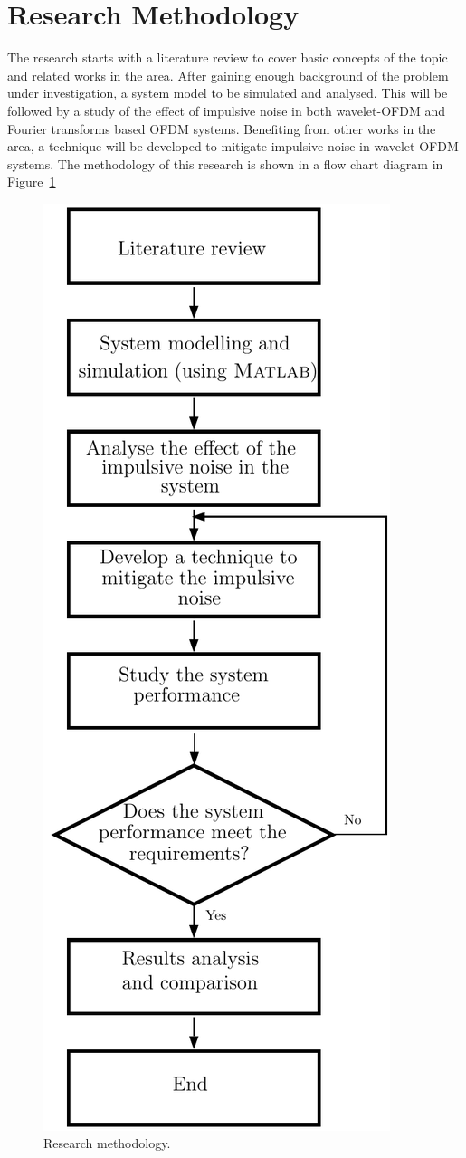 	\section{Research Methodology}
		The research starts with a literature review to cover basic concepts of the topic and related works in the area. After gaining enough background of the problem under investigation, a system model to be simulated and analysed. This will be followed by a study of the effect of impulsive noise in both wavelet-OFDM and Fourier transforms based OFDM systems. Benefiting from other works in the area, a technique will be developed to mitigate impulsive noise in wavelet-OFDM systems. The methodology of this research is shown in a flow chart diagram in Figure~\ref{fig1:method}
		\begin{figure}[p]
			\centering
			\includegraphics[scale=1]{./chap_1/method}
			\caption{Research methodology.}
			\label{fig1:method}
		\end{figure}
